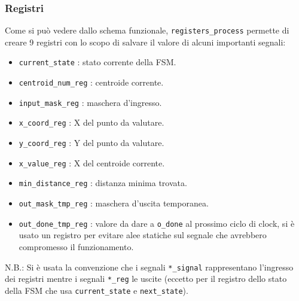 \documentclass{article}
\begin{document}
\subsubsection{Registri}
Come si può vedere dallo schema funzionale, \verb^registers_process^ permette di creare 9 registri con lo scopo di salvare il valore di alcuni importanti segnali:
\begin{itemize}
    \item \verb^current_state^ : stato corrente della FSM.
    \item \verb^centroid_num_reg^ : centroide corrente.
    \item \verb^input_mask_reg^ : maschera d'ingresso.
    \item \verb^x_coord_reg^ : X del punto da valutare.
    \item \verb^y_coord_reg^ : Y del punto da valutare.
    \item \verb^x_value_reg^ : X del centroide corrente.
    \item \verb^min_distance_reg^ : distanza minima trovata.
    \item \verb^out_mask_tmp_reg^ : maschera d'uscita temporanea.
    \item \verb^out_done_tmp_reg^ : valore da dare a \verb^o_done^ al prossimo ciclo di clock, si è usato un registro per evitare alee statiche sul segnale che avrebbero compromesso il funzionamento.
\end{itemize}
N.B.: Si è usata la convenzione che i segnali \verb^*_signal^ rappresentano l'ingresso dei registri mentre i segnali \verb^*_reg^ le uscite (eccetto per il registro dello stato della FSM che usa \verb^current_state^ e \verb^next_state^).
\end{document}

